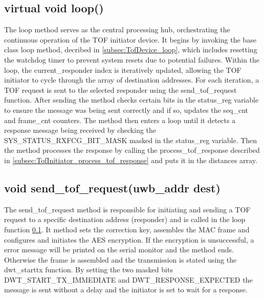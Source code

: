 \subsection{virtual void loop()}
\label{subsec:TofInitiator_loop}
The loop method serves as the central processing hub, orchestrating the continuous operation of the TOF initiator device. 
It begins by invoking the base class loop method, decribed in \ref{subsec:TofDevice_loop}, which includes resetting the watchdog timer to prevent system resets due to potential failures. 
\vspace{4pt}
\newline
Within the loop, the current\_responder index is iteratively updated, allowing the TOF initiator to cycle through the array of destination addresses. 
For each iteration, a TOF request is sent to the selected responder using the send\_tof\_request function. 
After sending the method checks certain bits in the status\_reg variable to ensure the message was being sent correctly and if so, updates the seq\_cnt and frame\_cnt counters. 
\vspace{4pt}
\newline
The method then enters a loop until it detects a response message being received by checking the SYS\_STATUS\_RXFCG\_BIT\_MASK masked in the status\_reg variable. 
Then the method processes the response by calling the process\_tof\_response described in \ref{subsec:TofInitiator_process_tof_response} and puts it in the distances array. 

\subsection{void send\_tof\_request(uwb\_addr dest)}
\label{subsec:TofInitiator_send_tof_request}
The send\_tof\_request method is responsible for initiating and sending a TOF request to a specific destination address (responder) and is called in the loop function \ref{subsec:TofInitiator_loop}. 
It method sets the correction key, assembles the MAC frame and configures and initiates the AES encryption. 
If the encryption is unsuccessful, a error message will be printed on the serial monitor and the method ends. 
Otherwise the frame is assembled and the transmission is stated using the dwt\_starttx function. 
By setting the two masked bits DWT\_START\_TX\_IMMEDIATE and DWT\_RESPONSE\_EXPECTED the message is sent without a delay and the initiator is set to wait for a response.  


